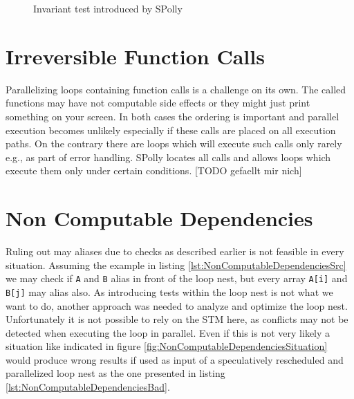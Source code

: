 \lstset{frame=none}
\begin{figure}[htbp]
  \centering
  \hspace*{5mm}
  \caption{Invariant test introduced by SPolly}
  \label{lst:InvariantTest}  
\end{figure}
\resetlst


\section{Irreversible Function Calls}
Parallelizing loops containing function calls is a challenge on its own. 
The called functions may have not computable side effects or they might just 
print something on your screen. In both cases the ordering is important and 
parallel execution becomes unlikely especially if these calls are placed on all
execution paths. On the contrary there are loops which will execute such
calls only rarely e.g., as part of error handling. SPolly locates all calls and
allows loops which execute them only under certain conditions.
[TODO gefaellt mir nich]


\section{Non Computable Dependencies}
Ruling out may aliases due to checks as described earlier is not feasible in every
situation. Assuming the example in listing \ref{lst:NonComputableDependenciesSrc}
we may check if \texttt{A} and \texttt{B} alias in front of the loop nest, but
every array \texttt{A[i]} and \texttt{B[j]} may alias also. As introducing tests 
within the loop nest is not what we want to do, another approach was needed to
analyze and optimize the loop nest. Unfortunately it is not possible to rely on 
the STM here, as conflicts may not be detected when executing the loop in parallel.
Even if this is not very likely a situation like indicated in figure
\ref{fig:NonComputableDependenciesSituation} would produce wrong results if used
as input of a speculatively rescheduled and parallelized loop nest as the one 
presented in listing \ref{lst:NonComputableDependenciesBad}.

